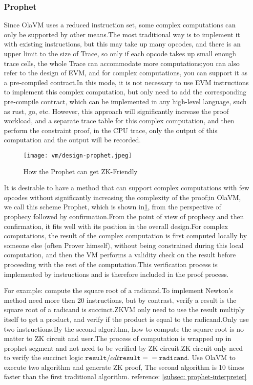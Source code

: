 \subsubsection{Prophet} \label{sec:design-prophet}

Since OlaVM uses a reduced instruction set, some complex computations can only be supported by other means.The most
traditional way is to implement it with existing instructions, but this may take up many opcodes, and there is an upper
limit to the size of Trace, so only if each opcode takes up small enough trace cells, the whole Trace can accommodate more
computations;you can also refer to the design of EVM, and for complex computations, you can support it as a pre-compiled
contract.In this mode, it is not necessary to use EVM instructions to implement this complex computation, but only need
to add the corresponding pre-compile contract, which can be implemented in any high-level language, such as rust, go, etc.
However, this approach will significantly increase the proof workload, and a separate trace table for this complex computation,
and then perform the constraint proof, in the CPU trace, only the output of this computation and the output will be recorded.

\begin{figure}[!ht]
    \centering
    \texttt{[image: vm/design-prophet.jpeg]}
    \caption{How the Prophet can get ZK-Friendly}
    \label{fig:design-prophet}
\end{figure}

It is desirable to have a method that can support complex computations with few opcodes without significantly increasing the
complexity of the proof;in OlaVM, we call this scheme Prophet, which is shown in\ref{fig:design-prophet}, from the perspective
of prophecy followed by confirmation.From the point of view of prophecy and then confirmation, it fits well with its position
in the overall design.For complex computations, the result of the complex computation is first computed locally by someone else
(often Prover himself), without being constrained during this local computation, and then the VM performs a validity check on the
result before proceeding with the rest of the computation.This verification process is implemented by instructions and is therefore
included in the proof process.

For example: compute the square root of a radicand.To implement Newton's method need more then 20 instructions, but by contrast,
verify a result is the square root of a radicand is succinct.ZKVM only need to use the result multiply itself to get a product, 
and verify if the product is equal to the radicand.Only use two instructions.By the second algorithm, how to compute the square
root is no matter to ZK circuit and user.The process of computation is wrapped up in prophet segment and not need to be verified
by ZK circuit.ZK circuit only need to verify the succinct logic $\texttt{result} /cdt \texttt{result} == \texttt{radicand}$.
Use OlaVM to execute two algorithm and generate ZK proof, The second algorithm is 10 times faster than the first traditional algorithm.
reference: \ref{subsec: prophet-interpreter}

